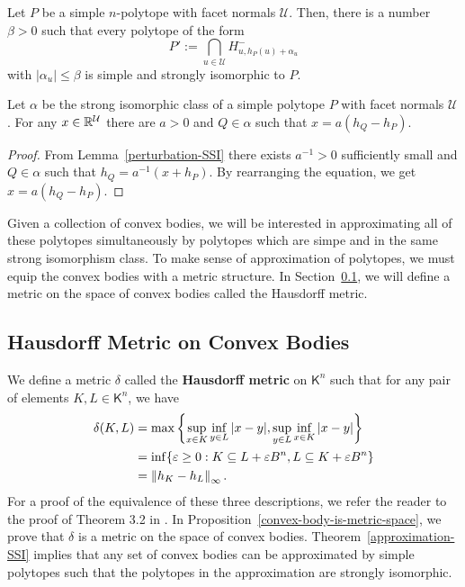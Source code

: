 \documentclass{puthesis-UG}
\begin{document}
\begin{lem} \label{perturbation-SSI}
	Let $P$ be a simple $n$-polytope with facet normals $\mathcal{U}$. Then, there is a number $\beta > 0$ such that every polytope of the form 
	\[
		P' := \bigcap_{u \in \mathcal{U}} H_{u, h_P(u) + \alpha_u}^-
	\]
	with $|\alpha_u| \leq \beta$ is simple and strongly isomorphic to $P$. 
\end{lem}

\begin{cor} \label{difference-of-support-vectors}
	Let $\alpha$ be the strong isomorphic class of a simple polytope $P$ with facet normals $\mathcal{U}$. For any $x \in \mathbb{R}^{\mathcal{U}}$ there are $a > 0$ and $Q \in \alpha$ such that $x = a (h_Q - h_P)$. 
\end{cor}

\begin{proof}
	From Lemma~\ref{perturbation-SSI} there exists $a^{-1} > 0$ sufficiently small and $Q \in \alpha$ such that $h_Q = a^{-1}(x + h_P)$. By rearranging the equation, we get $x = a(h_Q - h_P)$. 
\end{proof}

Given a collection of convex bodies, we will be interested in approximating all of these polytopes simultaneously by polytopes which are simpe and in the same strong isomorphism class. To make sense of approximation of polytopes, we must equip the convex bodies with a metric structure. In Section~\ref{sec:hausdorff-metric}, we will define a metric on the space of convex bodies called the Hausdorff metric. 

\subsection{Hausdorff Metric on Convex Bodies} \label{sec:hausdorff-metric}

We define a metric $\delta$ called the \textbf{Hausdorff metric} on $\mathsf{K}^n$ such that for any pair of elements $K, L \in \mathsf{K}^n$, we have 
\begin{align*}
	\delta (K, L) & = \max \left \{ \sup_{x \in K} \inf_{y \in L} |x-y|, \sup_{y \in L} \inf_{x \in K} |x-y|\right \} \\
	& = \inf \{\varepsilon \geq 0 : K \subseteq L + \varepsilon B^n, L \subseteq K + \varepsilon B^n\} \\
	& = \left\lVert h_K - h_L\right\rVert_\infty.
\end{align*}
For a proof of the equivalence of these three descriptions, we refer the reader to the proof of Theorem 3.2 in \cite{Hug2020-ue}. In Proposition~\ref{convex-body-is-metric-space}, we prove that $\delta$ is a metric on the space of convex bodies. Theorem~\ref{approximation-SSI} implies that any set of convex bodies can be approximated by simple polytopes such that the polytopes in the approximation are strongly isomorphic. 
\end{document}
